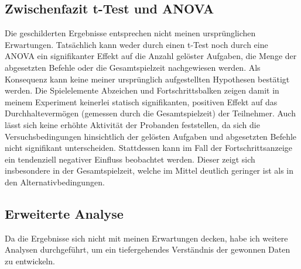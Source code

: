 \subsection{Zwischenfazit t-Test und ANOVA}
Die geschilderten Ergebnisse entsprechen nicht meinen ursprünglichen Erwartungen. Tatsächlich kann weder durch einen t-Test noch durch eine ANOVA ein signifikanter Effekt auf die Anzahl gelöster Aufgaben, die Menge der abgesetzten Befehle oder die Gesamtspielzeit nachgewiesen werden. Als Konsequenz kann keine meiner ursprünglich aufgestellten Hypothesen bestätigt werden. Die Spielelemente Abzeichen und Fortschrittsbalken zeigen damit in meinem Experiment keinerlei statisch signifikanten, positiven Effekt auf das Durchhaltevermögen (gemessen durch die Gesamtspielzeit) der Teilnehmer. Auch lässt sich keine erhöhte Aktivität der Probanden feststellen, da sich die Versuchsbedingungen hinsichtlich der gelösten Aufgaben und abgesetzten Befehle nicht signifikant unterscheiden. Stattdessen kann im Fall der Fortschrittsanzeige ein tendenziell negativer Einfluss beobachtet werden. Dieser zeigt sich insbesondere in der Gesamtspielzeit, welche im Mittel deutlich geringer ist als in den Alternativbedingungen. 


\subsection{Erweiterte Analyse}
Da die Ergebnisse sich nicht mit meinen Erwartungen decken, habe ich weitere Analysen durchgeführt, um ein tiefergehendes  Verständnis der gewonnen Daten zu entwickeln.